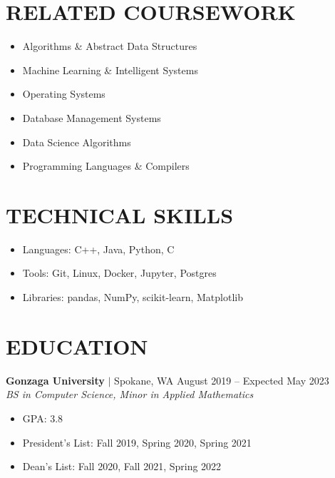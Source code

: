 \documentclass[11pt, a4paper, roman]{moderncv}
\newcommand{\education}[5]{
	\textbf{#1} $|$ #2
	\hfill#3
	\\\textit{#4}
	#5
	\vspace{2mm}
}
\begin{document}
\maketitle
\vspace*{-12mm}

\begin{multicols}{2}

\section{RELATED COURSEWORK}
{\begin{itemize}
    \item Algorithms \& Abstract Data Structures
    \item Machine Learning \& Intelligent Systems
    \item Operating Systems
    \item Database Management Systems
    \item Data Science Algorithms
    \item Programming Languages \& Compilers
  \end{itemize}
} 

\columnbreak

\section{TECHNICAL SKILLS}
{\begin{itemize}
    \item Languages: C++, Java, Python, C
    \item Tools: Git, Linux, Docker, Jupyter, Postgres
    \item Libraries: pandas, NumPy, scikit-learn, Matplotlib
  \end{itemize}
}
\end{multicols}
\vspace*{-2mm}
\section{EDUCATION}

\education{Gonzaga University}{Spokane, WA}{August 2019 -- Expected May 2023}{BS in Computer Science, Minor in Applied Mathematics}
	{\begin{itemize}
    		\item GPA: 3.8
    		\item President's List: Fall 2019, Spring 2020, Spring 2021
    		\item Dean's List: Fall 2020, Fall 2021, Spring 2022
  	\end{itemize}
}
\end{document}
